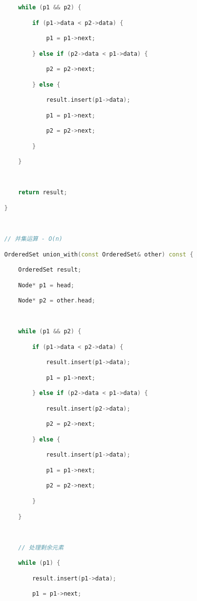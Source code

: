 \begin{lstlisting}[language=C++]
        while (p1 && p2) {

            if (p1->data < p2->data) {

                p1 = p1->next;

            } else if (p2->data < p1->data) {

                p2 = p2->next;

            } else {

                result.insert(p1->data);

                p1 = p1->next;

                p2 = p2->next;

            }

        }

  

        return result;

    }

  

    // 并集运算 - O(n)

    OrderedSet union_with(const OrderedSet& other) const {

        OrderedSet result;

        Node* p1 = head;

        Node* p2 = other.head;

  

        while (p1 && p2) {

            if (p1->data < p2->data) {

                result.insert(p1->data);

                p1 = p1->next;

            } else if (p2->data < p1->data) {

                result.insert(p2->data);

                p2 = p2->next;

            } else {

                result.insert(p1->data);

                p1 = p1->next;

                p2 = p2->next;

            }

        }

  

        // 处理剩余元素

        while (p1) {

            result.insert(p1->data);

            p1 = p1->next;


\end{lstlisting}
